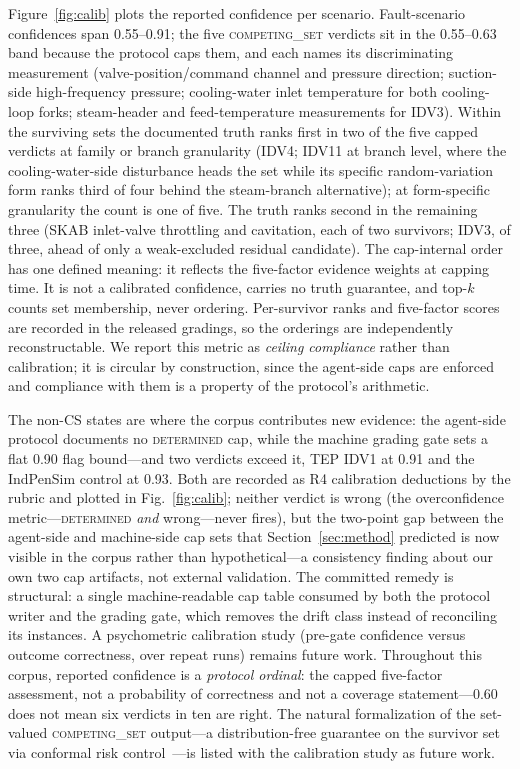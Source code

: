 \documentclass[preprint,12pt]{elsarticle}
\begin{document}
Figure~\ref{fig:calib} plots the reported confidence per scenario. Fault-scenario confidences span 0.55--0.91; the five \mbox{\textsc{competing\_set}} verdicts sit in the 0.55--0.63 band because the protocol caps them, and each names its discriminating measurement (valve-position/command channel and pressure direction; suction-side high-frequency pressure; cooling-water inlet temperature for both cooling-loop forks; steam-header and feed-temperature measurements for IDV3). Within the surviving sets the documented truth ranks first in two of the five capped verdicts at family or branch granularity (IDV4; IDV11 at branch level, where the cooling-water-side disturbance heads the set while its specific random-variation form ranks third of four behind the steam-branch alternative); at form-specific granularity the count is one of five. The truth ranks second in the remaining three (SKAB inlet-valve throttling and cavitation, each of two survivors; IDV3, of three, ahead of only a weak-excluded residual candidate). The cap-internal order has one defined meaning: it reflects the five-factor evidence weights at capping time. It is not a calibrated confidence, carries no truth guarantee, and top-$k$ counts set membership, never ordering. Per-survivor ranks and five-factor scores are recorded in the released gradings, so the orderings are independently reconstructable. We report this metric as \emph{ceiling compliance} rather than calibration; it is circular by construction, since the agent-side caps are enforced and compliance with them is a property of the protocol's arithmetic.

The non-CS states are where the corpus contributes new evidence: the agent-side protocol documents no \mbox{\textsc{determined}} cap, while the machine grading gate sets a flat 0.90 flag bound---and two verdicts exceed it, TEP IDV1 at 0.91 and the IndPenSim control at 0.93. Both are recorded as R4 calibration deductions by the rubric and plotted in Fig.~\ref{fig:calib}; neither verdict is wrong (the overconfidence metric---\mbox{\textsc{determined}} \emph{and} wrong---never fires), but the two-point gap between the agent-side and machine-side cap sets that Section~\ref{sec:method} predicted is now visible in the corpus rather than hypothetical---a consistency finding about our own two cap artifacts, not external validation. The committed remedy is structural: a single machine-readable cap table consumed by both the protocol writer and the grading gate, which removes the drift class instead of reconciling its instances. A psychometric calibration study (pre-gate confidence versus outcome correctness, over repeat runs) remains future work. Throughout this corpus, reported confidence is a \emph{protocol ordinal}: the capped five-factor assessment, not a probability of correctness and not a coverage statement---$0.60$ does not mean six verdicts in ten are right. The natural formalization of the set-valued \mbox{\textsc{competing\_set}} output---a distribution-free guarantee on the survivor set via conformal risk control~\cite{angelopoulos2023conformal}---is listed with the calibration study as future work.
\end{document}
